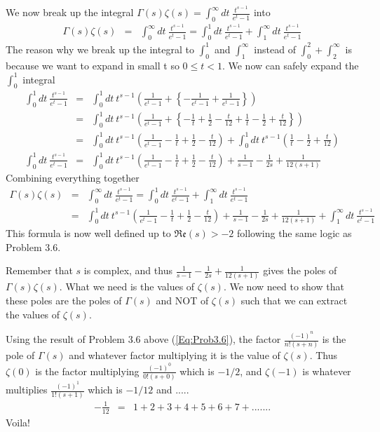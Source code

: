 \documentclass[aps,preprint,preprintnumbers,nofootinbib,showpacs,prd]{revtex4-1}
\newcommand{\nbea}{\begin{eqnarray*}}
\newcommand{\neea}{\end{eqnarray*}}
\begin{document}
We now break up the integral $\Gamma(s)\zeta(s) = \int_0^\infty dt~ \frac{t^{s-1}}{e^t - 1}$ into
%
\nbea
\Gamma(s)\zeta(s) & = & \int_0^\infty dt~ \frac{t^{s-1}}{e^t - 1} = \int_0^1 dt~ \frac{t^{s-1}}{e^t - 1} + \int_1^\infty dt~ \frac{t^{s-1}}{e^t - 1}
\neea
%
The reason why we break up the integral to $\int_0^1$ and $\int_1^\infty $ instead of $\int_0^2 + \int_2^\infty $ is because we want to expand in small t so $0 \leq t < 1$. We now can safely expand the $\int_0^1$ integral
%
\nbea
\int_0^1 dt~ \frac{t^{s-1}}{e^t - 1} & = & \int_0^1 dt~ t^{s-1} \left ( \frac{1}{e^t - 1} + \left\{ -\frac{1}{e^t - 1} + \frac{1}{e^t - 1}\right \}  \right ) \\
& = & \int_0^1 dt~ t^{s-1} \left ( \frac{1}{e^t - 1} + \left\{ -\frac{1}{t} + \frac{1}{2} - \frac{t}{12} +\frac{1}{t} - \frac{1}{2} + \frac{t}{12} \right \}  \right ) \\
& = & \int_0^1 dt~ t^{s-1} \left ( \frac{1}{e^t - 1}  -\frac{1}{t} + \frac{1}{2} - \frac{t}{12} \right ) + \int_0^1 dt~ t^{s-1} \left ( \frac{1}{t} - \frac{1}{2} + \frac{t}{12}  \right ) \\
\int_0^1 dt~ \frac{t^{s-1}}{e^t - 1} & = &  \int_0^1 dt~ t^{s-1} \left ( \frac{1}{e^t - 1}  -\frac{1}{t} + \frac{1}{2} - \frac{t}{12} \right ) + \frac{1}{s-1} - \frac{1}{2s} + \frac{1}{12(s+1)}
\neea
%
Combining everything together 
%
\nbea
\Gamma(s)\zeta(s) & = & \int_0^\infty dt~ \frac{t^{s-1}}{e^t - 1} = \int_0^1 dt~ \frac{t^{s-1}}{e^t - 1} + \int_1^\infty dt~ \frac{t^{s-1}}{e^t - 1} \\
& = & \int_0^1 dt~ t^{s-1} \left ( \frac{1}{e^t - 1}  -\frac{1}{t} + \frac{1}{2} - \frac{t}{12} \right ) + \frac{1}{s-1} - \frac{1}{2s} + \frac{1}{12(s+1)} + \int_1^\infty dt~ \frac{t^{s-1}}{e^t - 1}
\neea
%
This formula is now well defined up to $\mathfrak{Re}(s) > -2$ following the same logic as Problem 3.6.

Remember that $s$ is complex, and thus $ \frac{1}{s-1} - \frac{1}{2s} + \frac{1}{12(s+1)}$ gives the poles of $\Gamma(s)\zeta(s)$. What we need is the values of $\zeta(s)$. We now need to show that these poles are the poles of $\Gamma(s)$ and NOT of $\zeta(s)$ such that we can extract the values of $\zeta(s)$.

Using the result of Problem 3.6 above (\ref{Eq:Prob3.6}), the factor $\frac{(-1)^n}{n!(s+n)}$ is the pole of $\Gamma(s)$ and whatever factor multiplying it is the value of $\zeta(s)$. Thus $\zeta(0)$ is the factor multiplying $\frac{(-1)^0}{0!(s+0)}$ which is $-1/2$, and $\zeta(-1)$ is whatever multiplies $\frac{(-1)^1}{1!(s+1)}$ which is $-1/12$ and .....
%
\nbea
-\frac{1}{12} & = & 1 + 2 + 3 + 4 + 5 + 6 + 7 + .......
\neea
%
Voila!
\end{document}
